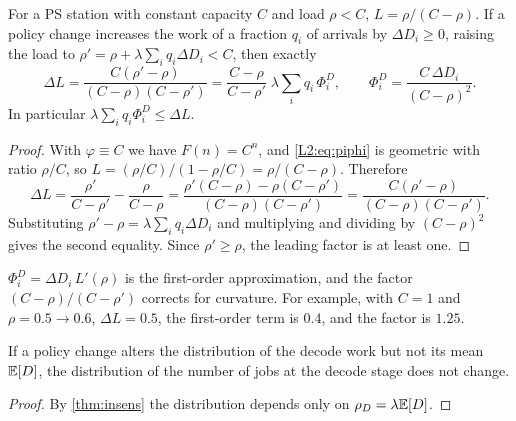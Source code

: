 \begin{proposition}\label{prop:decode-price}
For a PS station with constant capacity $C$ and load $\rho<C$, $L=\rho/(C-\rho)$. If a
policy change increases the work of a fraction $q_i$ of arrivals by $\Delta D_i\ge0$,
raising the load to $\rho'=\rho+\lambda\sum_iq_i\Delta D_i<C$, then exactly
\[
  \Delta L=\frac{C(\rho'-\rho)}{(C-\rho)(C-\rho')}
  =\frac{C-\rho}{C-\rho'}\;\lambda\sum_iq_i\,\Phi^D_i,\qquad
  \Phi^D_i=\frac{C\,\Delta D_i}{(C-\rho)^2} .
\]
In particular $\lambda\sum_iq_i\Phi^D_i\le\Delta L$.
\end{proposition}
\begin{proof}
With $\varphi\equiv C$ we have $F(n)=C^n$, and \eqref{L2:eq:piphi} is geometric with
ratio $\rho/C$, so $L=(\rho/C)/(1-\rho/C)=\rho/(C-\rho)$. Therefore
\[
  \Delta L=\frac{\rho'}{C-\rho'}-\frac{\rho}{C-\rho}=\frac{\rho'(C-\rho)-\rho(C-\rho')}{(C-\rho)(C-\rho')}
  =\frac{C(\rho'-\rho)}{(C-\rho)(C-\rho')} .
\]
Substituting $\rho'-\rho=\lambda\sum_iq_i\Delta D_i$ and multiplying and dividing by
$(C-\rho)^2$ gives the second equality. Since $\rho'\ge\rho$, the leading factor is at
least one.
\end{proof}

$\Phi^D_i=\Delta D_i\,L'(\rho)$ is the first-order approximation, and the factor
$(C-\rho)/(C-\rho')$ corrects for curvature. For example, with $C=1$ and
$\rho=0.5\to0.6$, $\Delta L=0.5$, the first-order term is $0.4$, and the factor is
$1.25$.

\begin{corollary}\label{L2:cor:decode-hit}
If a policy change alters the distribution of the decode work but not its mean $\mathbb{E}[D]$,
the distribution of the number of jobs at the decode stage does not change.
\end{corollary}
\begin{proof}
By \cref{thm:insens} the distribution depends only on $\rho_D=\lambda\mathbb{E}[D]$.
\end{proof}


